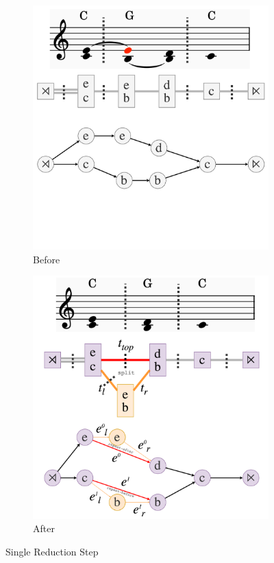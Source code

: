 \documentclass[12pt,a4paper,twoside,openright]{report}
\theoremstyle{definition}
\begin{document}
\begin{figure}[h]
  \centering
  \begin{subfigure}[t]{.49\textwidth}
    \centering\includegraphics[keepaspectratio,width=\textwidth]{impl/reduction/before.png}
    \caption{Before}
    \label{fig:reductionBefore}
  \end{subfigure}
  \begin{subfigure}[t]{.49\textwidth}
    \centering\includegraphics[keepaspectratio,width=\textwidth]{impl/reduction/after.png}
    \caption{After}
    \label{fig:reductionAfter}
  \end{subfigure}

  \captionsetup{width=.9\linewidth}
  \caption{Single Reduction Step}
  \label{fig:reductionStep}
\end{figure}
\end{document}
